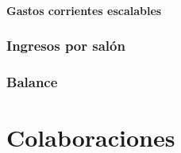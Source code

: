 \documentclass[10pt,letterpaper]{report}
\begin{document}
\subsubsection{Gastos corrientes escalables}

\subsection{Ingresos por salón}

\subsection{Balance}

\chapter{Colaboraciones}
\end{document}
